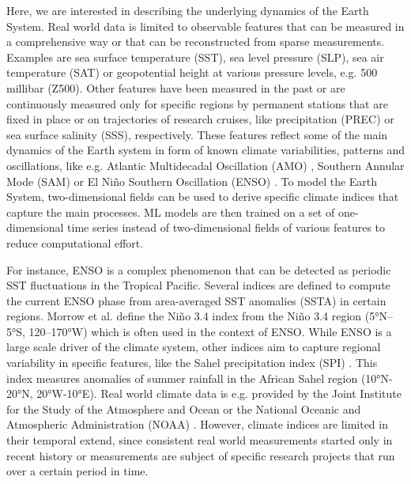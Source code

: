 \documentclass{CUP-JNL-DTM}%
\theoremstyle{definition}
\numberwithin{equation}{section}
\begin{document}
Here, we are interested in describing the underlying dynamics of the Earth System. Real world data is limited to observable features that can be measured in a comprehensive way or that can be reconstructed from sparse measurements. Examples are sea surface temperature (SST), sea level pressure (SLP), sea air temperature (SAT) or geopotential height at various pressure levels, e.g. 500 millibar (Z500). Other features have been measured in the past or are continuously measured only for specific regions by permanent stations that are fixed in place or on trajectories of research cruises, like precipitation (PREC) or sea surface salinity (SSS), respectively. These features reflect some of the main dynamics of the Earth system in form of known climate variabilities, patterns and oscillations, like e.g. Atlantic Multidecadal Oscillation (AMO) \cite{Schlesinger1994}, Southern Annular Mode (SAM) \cite{Gong1999} or El Ni\~{n}o Southern Oscillation (ENSO) \cite{Philander1989}. To model the Earth System, two-dimensional fields can be used to derive specific climate indices that capture the main processes. ML models are then trained on a set of one-dimensional time series instead of two-dimensional fields of various features to reduce computational effort.

For instance, ENSO is a complex phenomenon that can be detected as periodic SST fluctuations in the Tropical Pacific. Several indices are defined to compute the current ENSO phase from area-averaged SST anomalies (SSTA) in certain regions. Morrow et al. \cite{Morrow2010} define the Ni\~{n}o 3.4 index from the Ni\~{n}o 3.4 region (5°N–5°S, 120–170°W) which is often used in the context of ENSO. While ENSO is a large scale driver of the climate system, other indices aim to capture regional variability in specific features, like the Sahel precipitation index (SPI) \cite{Badr2014}. This index measures anomalies of summer rainfall in the African Sahel region (10°N-20°N, 20°W-10°E). Real world climate data is e.g. provided by the Joint Institute for the Study of the Atmosphere and Ocean \cite{JISAO} or the National Oceanic and Atmospheric Administration (NOAA) \cite{NOAA}. However, climate indices are limited in their temporal extend, since consistent real world measurements started only in recent history or measurements are subject of specific research projects that run over a certain period in time. 
\end{document}

